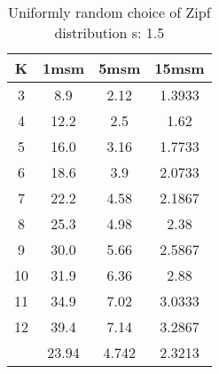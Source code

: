 \begin{table}[H]
\centering
\begin{tabular}{c|ccc}
K &1msm &5msm &15msm\\
\hline
3 & 8.9 & 2.12 & 1.3933\\
4 & 12.2 & 2.5 & 1.62\\
5 & 16.0 & 3.16 & 1.7733\\
6 & 18.6 & 3.9 & 2.0733\\
7 & 22.2 & 4.58 & 2.1867\\
8 & 25.3 & 4.98 & 2.38\\
9 & 30.0 & 5.66 & 2.5867\\
10 & 31.9 & 6.36 & 2.88\\
11 & 34.9 & 7.02 & 3.0333\\
12 & 39.4 & 7.14 & 3.2867\\
\hline
& 23.94 & 4.742 & 2.3213\\
\end{tabular}
\caption{Uniformly random choice of Zipf distribution s:	1.5}
\label{tab:s1.5}
\end{table}
